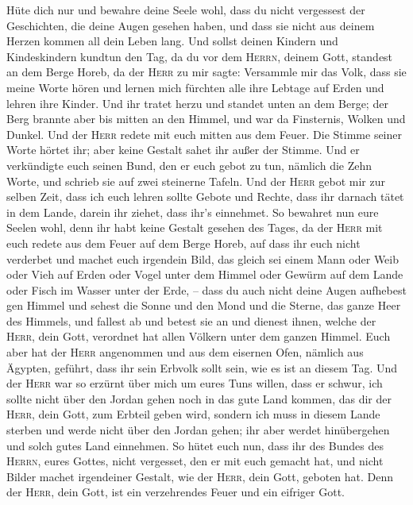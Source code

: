  Hüte dich nur und bewahre deine Seele wohl, dass du nicht
vergessest der Geschichten, die deine Augen gesehen haben, und dass sie
nicht aus deinem Herzen kommen all dein Leben lang. Und sollst deinen
Kindern und Kindeskindern kundtun  den Tag, da du vor dem
\textsc{Herrn}, deinem Gott, standest an dem Berge Horeb, da der
\textsc{Herr} zu mir sagte: Versammle mir das Volk, dass sie meine Worte
hören und lernen mich fürchten alle ihre Lebtage auf Erden und lehren
ihre Kinder.  Und ihr tratet herzu und standet unten an
dem Berge; der Berg brannte aber bis mitten an den Himmel, und war da
Finsternis, Wolken und Dunkel.  Und der \textsc{Herr}
redete mit euch mitten aus dem Feuer. Die Stimme seiner Worte hörtet
ihr; aber keine Gestalt sahet ihr außer der Stimme.  Und
er verkündigte euch seinen Bund, den er euch gebot zu tun, nämlich die
Zehn Worte, und schrieb sie auf zwei steinerne Tafeln. 
Und der \textsc{Herr} gebot mir zur selben Zeit, dass ich euch lehren
sollte Gebote und Rechte, dass ihr darnach tätet in dem Lande, darein
ihr ziehet, dass ihr's einnehmet.  So bewahret nun eure
Seelen wohl, denn ihr habt keine Gestalt gesehen des Tages, da der
\textsc{Herr} mit euch redete aus dem Feuer auf dem Berge Horeb,
 auf dass ihr euch nicht verderbet und machet euch
irgendein Bild, das gleich sei einem Mann oder Weib  oder
Vieh auf Erden oder Vogel unter dem Himmel  oder Gewürm
auf dem Lande oder Fisch im Wasser unter der Erde, -- 
dass du auch nicht deine Augen aufhebest gen Himmel und sehest die Sonne
und den Mond und die Sterne, das ganze Heer des Himmels, und fallest ab
und betest sie an und dienest ihnen, welche der \textsc{Herr}, dein
Gott, verordnet hat allen Völkern unter dem ganzen Himmel.
 Euch aber hat der \textsc{Herr} angenommen und aus dem
eisernen Ofen, nämlich aus Ägypten, geführt, dass ihr sein Erbvolk sollt
sein, wie es ist an diesem Tag.  Und der \textsc{Herr}
war so erzürnt über mich um eures Tuns willen, dass er schwur, ich
sollte nicht über den Jordan gehen noch in das gute Land kommen, das dir
der \textsc{Herr}, dein Gott, zum Erbteil geben wird, 
sondern ich muss in diesem Lande sterben und werde nicht über den Jordan
gehen; ihr aber werdet hinübergehen und solch gutes Land einnehmen.
 So hütet euch nun, dass ihr des Bundes des
\textsc{Herrn}, eures Gottes, nicht vergesset, den er mit euch gemacht
hat, und nicht Bilder machet irgendeiner Gestalt, wie der \textsc{Herr},
dein Gott, geboten hat.  Denn der \textsc{Herr}, dein
Gott, ist ein verzehrendes Feuer und ein eifriger Gott.

